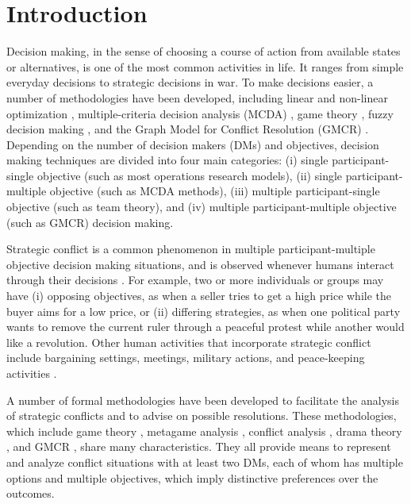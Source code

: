 \chapter{Introduction}\label{chap-intro}

Decision making, in the sense of choosing a course of action from available states or alternatives, is one of the most common activities in life. It ranges from simple everyday decisions to strategic decisions in war. To make decisions easier, a number of methodologies have been developed, including linear and non-linear optimization \citep{Bartholomew-Biggs2008, Chang2010, Taha1971}, multiple-criteria decision analysis (MCDA) \citep{Chang2010, Figueira-et-al2005, Hipel-et-al1993}, game theory \citep{VonNeumann&Morgenstern1944}, fuzzy decision making \citep{Nakamura1986, De-Wilde2004}, and the Graph Model for Conflict Resolution (GMCR) \citep{Fang-et-al1993, Kilgour-et-al1987}. Depending on the number of decision makers (DMs) and objectives, decision making techniques are divided into four main categories: (i) single participant-single objective (such as most operations research models), (ii) single participant-multiple objective (such as MCDA methods), (iii) multiple participant-single objective (such as team theory), and (iv) multiple participant-multiple objective (such as GMCR) decision making.

Strategic conflict is a common phenomenon in multiple participant-multiple objective decision making situations, and is observed whenever humans interact through their decisions \citep{Hipel2002, Hipel2009a, Hipel2009b, Kilgour&Eden2010}. For example, two or more individuals or groups may have (i) opposing objectives, as when a seller tries to get a high price while the buyer aims for a low price, or (ii) differing strategies, as when one political party wants to remove the current ruler through a peaceful protest while another would like a revolution. Other human activities that incorporate strategic conflict include bargaining settings, meetings, military actions, and peace-keeping activities \citep{Kilgour&Hipel2005}.

A number of formal methodologies have been developed to facilitate the analysis of strategic conflicts and to advise on possible resolutions. These methodologies, which include game theory \citep{VonNeumann&Morgenstern1944}, metagame analysis \citep{Howard1971}, conflict analysis \citep{Fraser&Hipel1984}, drama theory \citep{Howard1999}, and GMCR \citep{Kilgour-et-al1987, Fang-et-al1993}, share many characteristics. They all provide means to represent and analyze conflict situations with at least two DMs, each of whom has multiple options and multiple objectives, which imply distinctive preferences over the outcomes.

